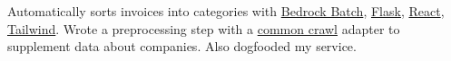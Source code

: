 {Automatically sorts invoices into categories with \href{https://docs.aws.amazon.com/bedrock/latest/userguide/batch-inference.html}{Bedrock Batch}, \href{https://github.com/pallets/flask}{Flask}, \href{https://react.dev/}{React}, \href{https://tailwindcss.com/}{Tailwind}. Wrote a preprocessing step with a \href{https://commoncrawl.org/}{common crawl} adapter to supplement data about companies. Also dogfooded my service.}
